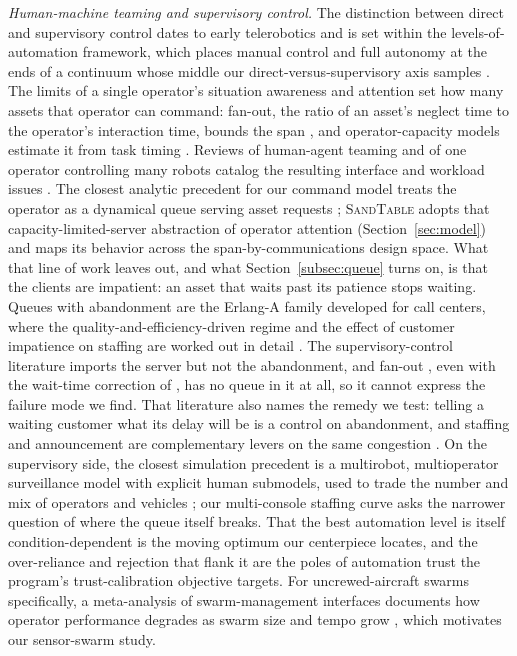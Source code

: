 \documentclass[11pt]{article}
\newcommand{\sandtable}{\textsc{SandTable}}
\begin{document}
\emph{Human-machine teaming and supervisory control.} The distinction between direct and supervisory control dates to early telerobotics \citep{sheridan1978supervisory} and is set within the levels-of-automation framework, which places manual control and full autonomy at the ends of a continuum whose middle our direct-versus-supervisory axis samples \citep{parasuraman2000types}. The limits of a single operator's situation awareness \citep{endsley1995awareness} and attention set how many assets that operator can command: fan-out, the ratio of an asset's neglect time to the operator's interaction time, bounds the span \citep{olsen2004fanout}, and operator-capacity models estimate it from task timing \citep{cummings2007capacity}. Reviews of human-agent teaming and of one operator controlling many robots catalog the resulting interface and workload issues \citep{chen2014teaming,chen2011supervisory,lewis2013human}. The closest analytic precedent for our command model treats the operator as a dynamical queue serving asset requests \citep{savla2012queue}; \sandtable{} adopts that capacity-limited-server abstraction of operator attention (Section~\ref{sec:model}) and maps its behavior across the span-by-communications design space. What that line of work leaves out, and what Section~\ref{subsec:queue} turns on, is that the clients are impatient: an asset that waits past its patience stops waiting. Queues with abandonment are the Erlang-A family developed for call centers, where the quality-and-efficiency-driven regime and the effect of customer impatience on staffing are worked out in detail \citep{garnett2002impatient,gans2003callcenters}. The supervisory-control literature imports the server but not the abandonment, and fan-out \citep{olsen2004fanout}, even with the wait-time correction of \citet{cummings2008predicting}, has no queue in it at all, so it cannot express the failure mode we find. That literature also names the remedy we test: telling a waiting customer what its delay will be is a control on abandonment, and staffing and announcement are complementary levers on the same congestion \citep{ibrahim2018announcements}. On the supervisory side, the closest simulation precedent is a multirobot, multioperator surveillance model with explicit human submodels, used to trade the number and mix of operators and vehicles \citep{humann2023multioperator}; our multi-console staffing curve asks the narrower question of where the queue itself breaks. That the best automation level is itself condition-dependent \citep{kaber2004effects} is the moving optimum our centerpiece locates, and the over-reliance and rejection that flank it are the poles of automation trust \citep{parasuraman1997humans} the program's trust-calibration objective targets. For uncrewed-aircraft swarms specifically, a meta-analysis of swarm-management interfaces documents how operator performance degrades as swarm size and tempo grow \citep{hocraffer2017meta}, which motivates our sensor-swarm study.
\end{document}
